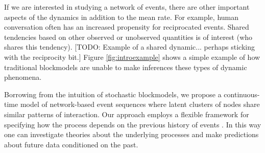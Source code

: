 If we are interested in studying a network of events, there are other important aspects of the dynamics in addition to the mean rate. 
For example, human conversation often has an increased propensity for reciprocated events.
Shared tendencies based on other observed or unobserved quantities is of interest (who shares this tendency).
[TODO: Example of a shared dynamic... perhaps sticking with the reciprocity bit.]
Figure \ref{fig:introexample} shows a simple example of how traditional blockmodels are unable to make inferences these types of dynamic phenomena. 





%

Borrowing from the intuition of stochastic blockmodels, we propose a continuous-time model of network-based event sequences where latent clusters of nodes share similar patterns of interaction.
Our approach employs a flexible framework for  specifying how the process depends on the previous history of events \cite{AalenOddO.2008, Butts2008}.
In this way one can investigate theories about the underlying processes and make predictions about future data conditioned on the past.


